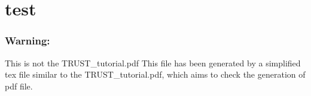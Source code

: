 \documentclass[10pt, hyperref={unicode=true,pdfusetitle, bookmarks=true,bookmarksnumbered=false,bookmarksopen=false, breaklinks=false,pdfborder={0 0 1},backref=true,colorlinks=true,linkcolor=blue,pageanchor}]{beamer}
\begin{document}
\section{test}
\begin{frame}
\frametitle{Warning:}
\begin{block}{This is not the TRUST\_tutorial.pdf}
This file has been generated by a simplified tex file similar to the TRUST\_tutorial.pdf, which aims to check the generation of pdf file.
\end{block}

\end{frame}
\end{document}
